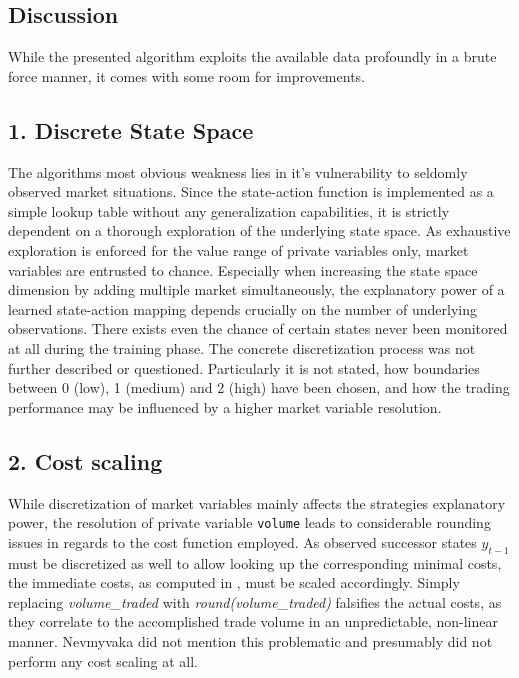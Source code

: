 \subsection{Discussion}
While the presented algorithm exploits the available data profoundly in a brute force manner, it comes with some room for improvements.\\

\subsection*{1. Discrete State Space}
The algorithms most obvious weakness lies in it's vulnerability to seldomly observed market situations. Since the state-action function is implemented as a simple lookup table without any generalization capabilities, it is strictly dependent on a thorough exploration of the underlying state space. As exhaustive exploration is enforced for the value range of private variables only, market variables are entrusted to chance. Especially when increasing the state space dimension by adding multiple market simultaneously, the explanatory power of a learned state-action mapping depends crucially on the number of underlying observations. There exists even the chance of certain states never been monitored at all during the training phase. The concrete discretization process was not further described or questioned. Particularly it is not stated, how boundaries between 0 (low), 1 (medium) and 2 (high) have been chosen, and how the trading performance may be influenced by a higher market variable resolution.

\subsection*{2. Cost scaling}
While discretization of market variables mainly affects the strategies explanatory power, the resolution of private variable \lstinline!volume! leads to considerable rounding issues in regards to the cost function employed. As observed successor states $y_{t-1}$ must be discretized as well to allow looking up the corresponding minimal costs, the immediate costs, as computed in , must be scaled accordingly. Simply replacing \emph{volume\_traded} with \emph{round(volume\_traded)} falsifies the actual costs, as they correlate to the accomplished trade volume in an  unpredictable, non-linear manner. Nevmyvaka \etal \Cite{Nevmyvaka:2006} did not mention this problematic and presumably did not perform any cost scaling at all.

